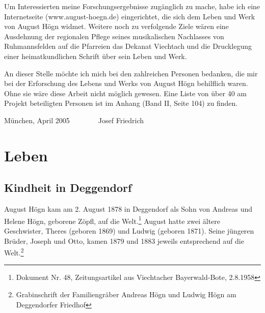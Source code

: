 \documentclass[a4paper]{article}
\begin{document}
Um Interessierten meine Forschungsergebnisse zugänglich zu mache, habe
ich eine Internetseite (www.august-hoegn.de) eingerichtet, die sich dem
Leben und Werk von August Högn widmet. Weitere noch zu verfolgende
Ziele wären eine Ausdehnung der regionalen Pflege seines musikalischen
Nachlasses von Ruhmannsfelden auf die Pfarreien das Dekanat Viechtach
und die Drucklegung einer heimatkundlichen Schrift über sein Leben und
Werk.

An dieser Stelle möchte ich mich bei den zahlreichen Personen bedanken,
die mir bei der Erforschung des Lebens und Werks von August Högn
behilflich waren. Ohne sie wäre diese Arbeit nicht möglich gewesen.
Eine Liste von über 40 am Projekt beteiligten Personen ist im Anhang
(Band II, Seite 104) zu finden.

München, April 2005\ \ \ \ \ \ \ \ Josef Friedrich

\section{Leben}
\hypertarget{RefHeadingToc100333725}{}\subsection{Kindheit in
Deggendorf}
\hypertarget{RefHeadingToc100333726}{}August Högn kam am 2. August 1878
in Deggendorf als Sohn von Andreas und Helene Högn, geborene Zöpfl, auf
die Welt.\footnote{ Dokument Nr. 48, Zeitungsartikel aus Viechtacher
Bayerwald-Bote, 2.8.1958} August hatte zwei ältere Geschwister, Theres
(geboren 1869) und Ludwig (geboren 1871). Seine jüngeren Brüder, Joseph
und Otto, kamen 1879 und 1883 jeweils entsprechend auf die
Welt.\footnote{ Grabinschrift der Familiengräber Andreas Högn und
Ludwig Högn am Deggendorfer Friedhof}
\end{document}
